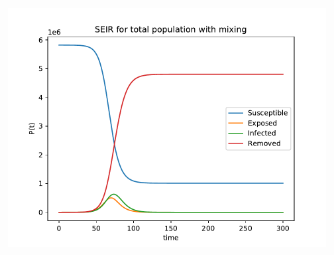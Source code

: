 \begin{figure}[H]
\centering
\includegraphics[width = 0.75\textwidth]{../fig/SEIR_total_population_mix_q.pdf}
\caption{
\protect 
\label{fig:total_pop_mix_q}}
\end{figure}

